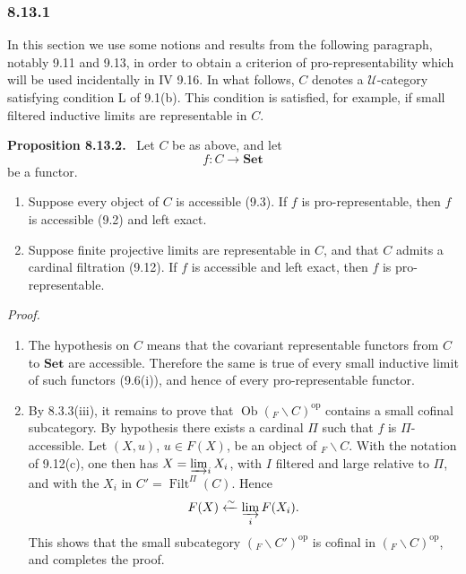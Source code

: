 \documentclass[11pt]{article}
\newcommand{\U}{\mathcal{U}}
\newcommand{\Set}{\mathbf{Set}}
\newcommand{\Ob}{\operatorname{Ob}}
\newcommand{\Filt}{\operatorname{Filt}}
\newcommand{\op}{\mathrm{op}}
\newenvironment{statement}[1]{\par\medskip\noindent\textbf{#1.}\ }{\par\medskip}
\newenvironment{prooftext}{\par\noindent\emph{Proof.}\ }{\par\medskip}
\begin{document}
\subsubsection*{8.13.1}
In this section we use some notions and results from the following paragraph, notably 9.11 and 9.13, in order to obtain a criterion of pro-representability which will be used incidentally in IV 9.16. In what follows, $C$ denotes a $\U$-category satisfying condition L of 9.1(b). This condition is satisfied, for example, if small filtered inductive limits are representable in $C$.

\begin{statement}{Proposition 8.13.2}
Let $C$ be as above, and let
\[
 f:C\longrightarrow\Set
\]
be a functor.
\begin{enumerate}[label=\alph*)]
\item Suppose every object of $C$ is accessible (9.3). If $f$ is pro-representable, then $f$ is accessible (9.2) and left exact.

\item Suppose finite projective limits are representable in $C$, and that $C$ admits a cardinal filtration (9.12). If $f$ is accessible and left exact, then $f$ is pro-representable.
\end{enumerate}
\end{statement}

\begin{prooftext}
\begin{enumerate}[label=\alph*)]
\item The hypothesis on $C$ means that the covariant representable functors from $C$ to $\Set$ are accessible. Therefore the same is true of every small inductive limit of such functors (9.6(i)), and hence of every pro-representable functor.

\item By 8.3.3(iii), it remains to prove that $\Ob({}_F\backslash C)^\op$ contains a small cofinal subcategory. By hypothesis there exists a cardinal $\Pi$ such that $f$ is $\Pi$-accessible. Let $(X,u)$, $u\in F(X)$, be an object of ${}_F\backslash C$. With the notation of 9.12(c), one then has $X=\varinjlim_i X_i$, with $I$ filtered and large relative to $\Pi$, and with the $X_i$ in $C'=\Filt^{\Pi}(C)$. Hence
\[
 F(X)\xleftarrow{\sim}\varinjlim_i F(X_i).
\]
This shows that the small subcategory $({}_F\backslash C')^\op$ is cofinal in $({}_F\backslash C)^\op$, and completes the proof.
\end{enumerate}
\end{prooftext}
\end{document}
